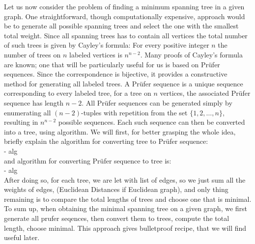 \documentclass[12pt]{book}
\begin{document}
		Let us now consider the problem of finding a minimum spanning tree in a given graph. One straightforward, though computationally expensive, approach would be to generate all possible spanning trees and select the one with the smallest total weight. Since all spanning trees has to contain all vertices the total number of such trees is given by Cayley’s formula: For every positive integer \(n\) the number of trees on \(n\) labeled vertices is \(n^{n-2}\). Many proofs of Cayley's formula are known; one that will be particularly useful for us is based on Prüfer sequences.  
		Since the correspondence is bijective, it provides a constructive method for generating all labeled trees. A Prüfer sequence is a unique sequence corresponding to every labeled tree, for a tree on \( n \) vertices, the associated Prüfer sequence has length \( n - 2 \). All Prüfer sequences can be generated simply by enumerating all \( (n - 2) \)-tuples with repetition from the set \( \{1, 2, \dots, n\} \), resulting in \( n^{n-2} \) possible sequences. Each such sequence can then be converted into a tree, using algorithm. We will first, for better grasping the whole idea, briefly explain the algorithm for converting tree to Prüfer sequence:
		\\- alg
		\\and algorithm for converting Prüfer sequence to tree is:
		\\- alg
		\\After doing so, for each tree, we are let with list of edges, so we just sum all the weights of edges, (Euclidean Distances if Euclidean graph), and only thing remaining is to compare the total lengths of trees and choose one that is minimal. To sum up, when obtaining the minimal spanning tree on a given graph, we first generate all prufer seqences, then convert them to trees, compute the total length, choose minimal. This approach gives bulletproof recipe, that we will find useful later.   
	
\end{document}
